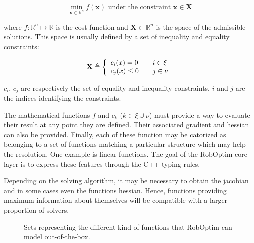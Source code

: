 \documentclass[conference,final,a4paper,twocolumn,9pt]{IEEEtran}
\begin{document}
\begin{equation}\label{eq:optimization}
  \min_{\mathbf{x} \in \mathbb{R}^n} f(\mathbf{x}) \text{ under the constraint } \mathbf{x} \in \mathbf{X}
\end{equation}

where $f : \mathbb{R}^n \mapsto \mathbb{R}$ is the cost function and
$\mathbf{X} \subset \mathbb{R}^n$ is the space of the admissible
solutions. This space is usually defined by a set of inequality and
equality constraints:

\begin{equation}
  \mathbf{X} \triangleq \left\{
  \begin{array}{l l}
    c_i (x) = 0    & \quad i \in \xi \\
    c_j (x) \leq 0 & \quad j \in \nu \\
  \end{array} \right.
\end{equation}

$c_i$, $c_j$ are respectively the set of equality and inequality
constraints. $i$ and $j$ are the indices identifying the constraints.

The mathematical functions $f$ and $c_k$ ($k \in \xi \cup \nu$) must
provide a way to evaluate their result at any point they are
defined. Their associated gradient and hessian can also be
provided. Finally, each of these function may be catorized as
belonging to a set of functions matching a particular structure which
may help the resolution. One example is linear functions. The goal of
the RobOptim core layer is to express these features through the C++
typing rules.


Depending on the solving algorithm, it may be necessary to obtain the
jacobian and in some cases even the functions hessian. Hence,
functions providing maximum information about themselves will be
compatible with a larger proportion of solvers.

\begin{figure}[ht!]
  \begin{center}
  \end{center}
  \caption{Sets representing the different kind of functions that
    RobOptim can model out-of-the-box.}\label{fig:functions}
\end{figure}
\end{document}
